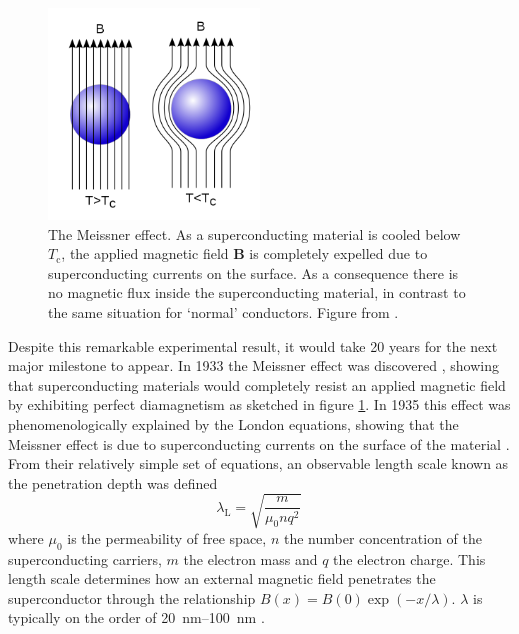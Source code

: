 \begin{figure}
    \centering
    \includegraphics[width=0.5\textwidth]{fig/intro/meissner.png}
    \caption[Meissner effect]{The Meissner effect. As a superconducting material is cooled below $T_\text{c}$, the applied magnetic field $\bm{B}$ is completely expelled due to superconducting currents on the surface. As a consequence there is no magnetic flux inside the superconducting material, in contrast to the same situation for `normal' conductors. Figure from \cite{wiki:meissner}.}
    \label{fig:meissner}
\end{figure}

Despite this remarkable experimental result, it would take 20 years for the next major milestone to appear. In 1933 the Meissner effect was discovered \cite{Meissner1933}, showing that superconducting materials would completely resist an applied magnetic field by exhibiting perfect diamagnetism as sketched in figure \ref{fig:meissner}. In 1935 this effect was phenomenologically explained by the London equations, showing that the Meissner effect is due to superconducting currents on the surface of the material \cite{London1935}. From their relatively simple set of equations, an observable length scale known as the penetration depth was defined
%
\[ \lambda_\text{L} = \sqrt{\frac{m}{\mu_0 n q^2}} \, \]
%
where $\mu_0$ is the permeability of free space, $n$ the number concentration of the superconducting carriers, $m$ the electron mass and $q$ the electron charge. This length scale determines how an external magnetic field penetrates the superconductor through the relationship $B(x) = B(0) \exp (-x / \lambda)$. $\lambda$ is typically on the order of \SIrange{20}{100}{\nano\meter} \cite{Kittel2005}.


